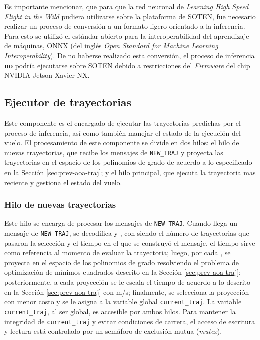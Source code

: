 Es importante mencionar, que para que la red neuronal de \textit{Learning High Speed Flight in the Wild} \cite{Loquercio2021} pudiera utilizarse sobre la plataforma de SOTEN, fue necesario realizar un proceso de conversión a un formato ligero orientado a la inferencia. Para esto se utilizó el estándar abierto para la interoperabilidad del aprendizaje de máquinas, ONNX \cite{onnx} (del inglés \textit{Open Standard for Machine Learning Interoperability}). De no haberse realizado esta conversión, el proceso de inferencia \textbf{no} podría ejecutarse sobre SOTEN debido a restricciones del \textit{Firmware} del chip NVIDIA Jetson Xavier NX.

\pagebreak

\subsection{Ejecutor de trayectorias}

Este componente es el encargado de ejecutar las trayectorias predichas por el proceso de inferencia, así como también manejar el estado de la ejecución del vuelo. El procesamiento de este componente se divide en dos hilos: el hilo de nuevas trayectorias, que recibe los mensajes de \texttt{NEW\_TRAJ} y proyecta las trayectorias en el espacio de los polinomios de grado  de acuerdo a lo especificado en la Sección \ref{sec:prev-aoa-traj}; y el hilo principal, que ejecuta la trayectoria mas reciente y gestiona el estado del vuelo.

\subsubsection*{Hilo de nuevas trayectorias}

Este hilo se encarga de procesar los mensajes de \texttt{NEW\_TRAJ}. Cuando llega un mensaje de \texttt{NEW\_TRAJ}, se decodifica  y , con \jim{\beta} siendo el número  de trayectorias que pasaron la selección  y  el tiempo en el que se construyó el mensaje, el tiempo  sirve como referencia al momento de evaluar la trayectoria; luego, por cada , se proyecta  en el espacio de los polinomios de grado  resolviendo el problema de optimización de mínimos cuadrados descrito en la Sección \ref{sec:prev-aoa-traj}; posteriormente, a cada proyección  se le escala el tiempo  de acuerdo a lo descrito en la Sección \ref{sec:prev-aoa-traj} con  m/s; finalmente, se selecciona la proyección con menor costo  y se le asigna a la variable global \texttt{current\_traj}. La variable \texttt{current\_traj}, al ser global, es accesible por ambos hilos. Para mantener la integridad de \texttt{current\_traj} y evitar condiciones de carrera,  el acceso de escritura y lectura está controlado por un semáforo de exclusión mutua (\textit{mutex}).


